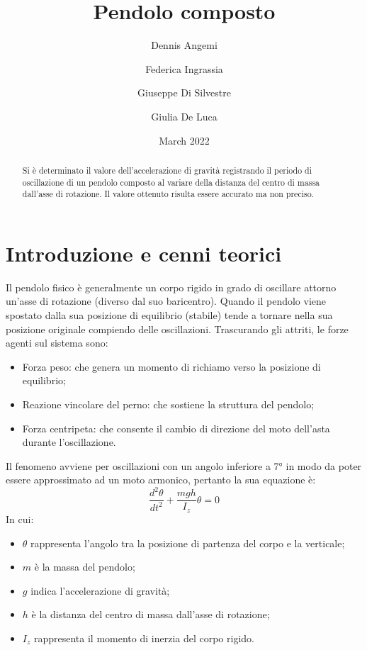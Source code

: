 \documentclass[11pt,a4paper]{article}
\title{Pendolo composto}
\author[1]{Dennis Angemi}%
\author[1]{Federica Ingrassia}%
\author[1]{Giuseppe Di Silvestre}%
\author[1]{Giulia De Luca}%
\affil[1]{Dipartimento di Fisica e Astronomia ``Ettore Majorana'' - Università degli Studi di Catania}%
\date{March 2022}
\begin{document}
\maketitle

\begin{abstract}
    Si è determinato il valore dell'accelerazione di gravità registrando il periodo di oscillazione di un pendolo composto al variare della distanza del centro di massa dall'asse di rotazione. Il valore ottenuto risulta essere accurato ma non preciso.
\end{abstract}

\section{Introduzione e cenni teorici}
Il pendolo fisico è generalmente un corpo rigido in grado di oscillare attorno un'asse di rotazione (diverso dal suo baricentro).
Quando il pendolo viene spostato dalla sua posizione di equilibrio (stabile) tende a tornare nella sua posizione originale compiendo delle oscillazioni. 
Trascurando gli attriti, le forze agenti sul sistema sono:
\begin{itemize}
    \item Forza peso: che genera un momento di richiamo verso la posizione di equilibrio;
    \item Reazione vincolare del perno: che sostiene la struttura del pendolo;
    \item Forza centripeta: che consente il cambio di direzione del moto dell'asta durante l'oscillazione.
\end{itemize}
Il fenomeno avviene per oscillazioni con un angolo inferiore a 7° in modo da poter essere approssimato ad un moto armonico, pertanto la sua equazione è:
\begin{equation}
    \frac{d^2\theta}{dt^2}+\frac{mgh}{I_z}\theta=0
\end{equation}
In cui:
\begin{itemize}
    \item $\theta$ rappresenta l'angolo tra la posizione di partenza del corpo e la verticale;
    \item $m$ è la massa del pendolo;
    \item $g$ indica l'accelerazione di gravità;
    \item $h$ è la distanza del centro di massa dall'asse di rotazione;
    \item $I_z$ rappresenta il momento di inerzia del corpo rigido.
    
\end{itemize}
\end{document}
